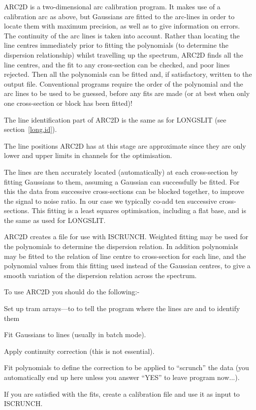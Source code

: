 ARC2D is a two-dimensional arc calibration program. It makes use of a
calibration arc as above, but Gaussians are fitted to the arc-lines in
order to locate them with maximum precision, as well as to give
information on errors. The continuity of the arc lines is taken into
account. Rather than locating the line centres immediately prior to
fitting the polynomials (to determine the dispersion relationship)
whilst travelling up the spectrum, ARC2D finds all the line centres,
and the fit to any cross-section can be checked, and poor lines
rejected. Then all the polynomials can be fitted and, if satisfactory,
written to the output file. Conventional programs require the order of
the polynomial and the arc lines to be used to be guessed, before any
fits are made (or at best when only one cross-section or block has been
fitted)!

The line identification part of ARC2D is the same as for LONGSLIT (see
section~\ref{long.id}).

The line positions ARC2D has at this stage are approximate since they
are only lower and upper limits in channels for the optimisation.

The lines are then accurately located (automatically) at each
cross-section by fitting Gaussians to them, assuming a Gaussian can
successfully be fitted. For this the data from successive
cross-sections can be blocked together, to improve the signal to noise
ratio. In our case we typically co-add ten successive cross-sections.
This fitting is a least squares optimisation, including a flat base,
and is the same as used for LONGSLIT. 

ARC2D creates a file for use with ISCRUNCH.
Weighted fitting may be used for the
polynomials to determine the dispersion relation. In addition
polynomials may be fitted to the relation of line centre to
cross-section for each line, and the polynomial values from this
fitting used instead of the Gaussian centres, to give a smooth
variation of the dispersion relation across the spectrum.

  To use ARC2D you should do the following:-
\begin{list}{()}{}
\item Set up tram arrays---to to tell the program where the lines are
and to identify them
\item Fit Gaussians to lines (usually in batch mode).
\item Apply continuity correction (this is not essential).
\item Fit polynomials to define the correction to be applied to
``scrunch'' the data (you automatically end up here unless you answer
``YES'' to leave program now...).
\item If you are satisfied with the fits, create a calibration file and
use it as input to ISCRUNCH.
\end{list}

